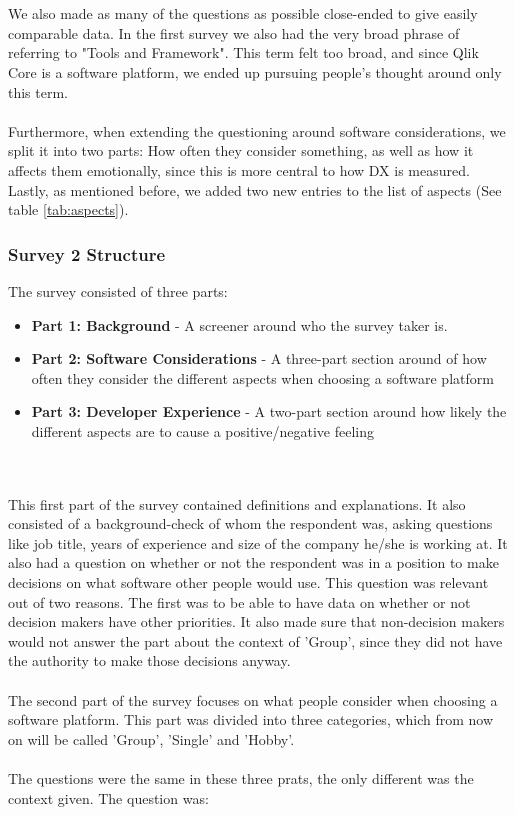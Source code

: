 \documentclass{cslthse-msc}
\begin{document}
    \\ \\
    We also made as many of the questions as possible close-ended to give easily comparable data. In the first survey we also had the very broad phrase of referring to "Tools and Framework". This term felt too broad, and since Qlik Core is a software platform, we ended up pursuing people's thought around only this term.
    \\ \\
    Furthermore, when extending the questioning around software considerations, we split it into two parts: How often they consider something, as well as how it affects them emotionally, since this is more central to how DX is measured. Lastly, as mentioned before, we added two new entries to the list of aspects (See table \ref{tab:aspects}).

    \subsubsection{Survey 2 Structure}

    The survey consisted of three parts:
    \begin{itemize}[label={}]
        \item \textbf{Part 1: Background} - A screener around who the survey taker is.
        \item \textbf{Part 2: Software Considerations} - A three-part section around of how often they consider the different aspects when choosing a software platform
        \item \textbf{Part 3: Developer Experience} - A two-part section around how likely the different aspects are to cause a positive/negative feeling
    \end{itemize}
    \\ \\
    This first part of the survey contained definitions and explanations. It also consisted of a background-check of whom the respondent was, asking questions like job title, years of experience and size of the company he/she is working at. It also had a question on whether or not the respondent was in a position to make decisions on what software other people would use. This question was relevant out of two reasons. The first was to be able to have data on whether or not decision makers have other priorities. It also made sure that non-decision makers would not answer the part about the context of 'Group', since they did not have the authority to make those decisions anyway.
    \\ \\
    The second part of the survey focuses on what people consider when choosing a
    software platform. This part was divided into three categories, which
    from now on will be called 'Group', 'Single' and 'Hobby'.
    \\ \\
    The questions were the same in these three prats, the only
    different was the context given. The question was:
\end{document}
